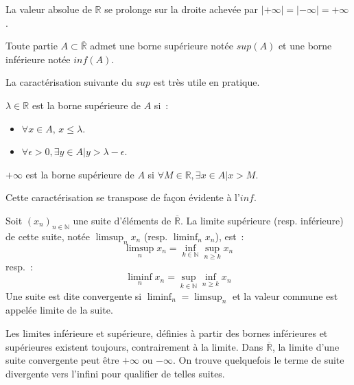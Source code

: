 La valeur absolue de $\mathbb{R}$ se prolonge sur la droite achevée
par $|+\infty|=|-\infty|=+\infty$.
\begin{prop}
Toute partie $A \subset \overline{\mathbb{R}}$ admet une borne
supérieure notée $sup(A)$ et une borne inférieure notée $inf(A)$.
\end{prop}
La caractérisation suivante du $sup$ est très utile en pratique.
\begin{prop}
$\lambda \in \mathbb{R}$ est la borne supérieure de $A$ si~:
\begin{itemize}
\item $\forall x \in A, \, x \leq \lambda$.
\item $\forall \epsilon > 0, \exists y \in A | y > \lambda - \epsilon$.
\end{itemize}
$+\infty$ est la borne supérieure de $A$ si $\forall M \in
\mathbb{R}, \exists x \in A | x > M$. 
\end{prop}
Cette caractérisation se transpose de façon évidente à l'$inf$.
\begin{mandatory}
\begin{defn}
Soit $(x_n)_{n \in \mathbb{N}}$ une suite d'éléments de
$\overline{\mathbb{R}}$. La limite supérieure (resp. inférieure) de
cette suite, notée $\limsup_n x_n$ (resp. $\liminf_n x_n$), est~:
\[ \limsup_n x_n =\inf_{k \in \mathbb{N}} \sup_{n \geq k} x_n 
\]
resp.~:
\[ \liminf_n x_n = \sup_{k \in \mathbb{N}} \inf_{n \geq k} x_n
\]
 Une suite est dite convergente
si $\liminf_n = \limsup_n$ et la valeur commune est appelée limite de
la suite.
\end{defn}
\end{mandatory}
\begin{rem}
Les limites inférieure et supérieure, définies à partir des bornes
inférieures et supérieures existent toujours, contrairement à la
limite. Dans $\overline{\mathbb{R}}$, la limite d'une suite
convergente peut être $+\infty$ ou $-\infty$. On trouve quelquefois le
terme de suite divergente vers l'infini pour qualifier de telles suites.
\end{rem}
